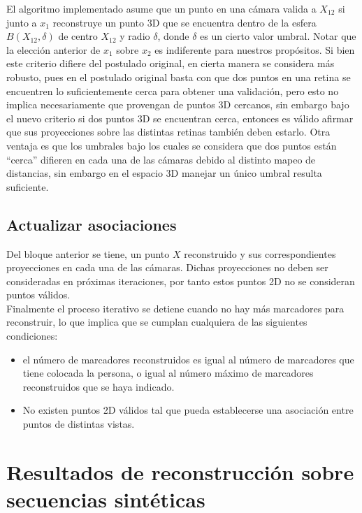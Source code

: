 El algoritmo implementado asume que un punto en una cámara valida a $X_{12}$ si junto a $x_1$ reconstruye un punto 3D que se encuentra dentro de la esfera $B(X_{12}, \delta)$ de centro $X_{12}$ y radio $\delta$, donde $\delta$ es un cierto valor umbral. Notar que la elección anterior de $x_1$ sobre $x_2$ es indiferente para nuestros propósitos. Si bien este criterio difiere del postulado original, en cierta manera se considera más robusto, pues en el postulado original basta con que dos puntos en una retina se encuentren lo suficientemente cerca para obtener una validación, pero esto no implica necesariamente que provengan de puntos 3D cercanos, sin embargo bajo el nuevo criterio si dos puntos 3D se encuentran cerca, entonces es válido afirmar que sus proyecciones sobre las distintas retinas también deben estarlo. Otra ventaja es que los umbrales bajo los cuales se considera que dos puntos están ``cerca'' difieren en cada una de las cámaras debido al distinto mapeo de distancias, sin embargo en el espacio 3D manejar un único umbral resulta suficiente.       

\subsection{Actualizar asociaciones}\label{actualizar_asociaciones}

Del bloque anterior se tiene, un punto $X$ reconstruido y sus correspondientes proyecciones en cada una de las cámaras. Dichas proyecciones no deben ser consideradas en próximas iteraciones, por tanto estos puntos 2D no se consideran puntos válidos.\\



Finalmente el proceso iterativo se detiene cuando no hay más marcadores para reconstruir, lo que implica que se cumplan cualquiera de las siguientes condiciones:\\
\begin{itemize}
\item el número de marcadores reconstruidos es igual al número de marcadores que tiene colocada la persona, o igual al número máximo de marcadores  reconstruidos que se haya indicado.

\item No existen puntos 2D válidos tal que pueda establecerse una asociación entre puntos de distintas vistas.
\end{itemize}




\section{Resultados de reconstrucción sobre secuencias sintéticas}

